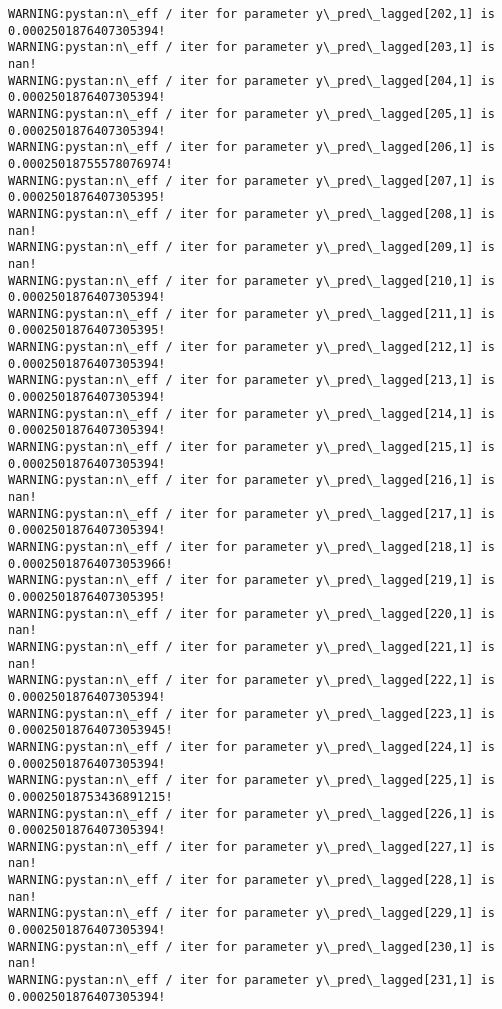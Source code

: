 \documentclass[11pt]{article}
\begin{document}
\begin{Verbatim}[commandchars=\\\{\}]
WARNING:pystan:n\_eff / iter for parameter y\_pred\_lagged[202,1] is 0.0002501876407305394!
WARNING:pystan:n\_eff / iter for parameter y\_pred\_lagged[203,1] is nan!
WARNING:pystan:n\_eff / iter for parameter y\_pred\_lagged[204,1] is 0.0002501876407305394!
WARNING:pystan:n\_eff / iter for parameter y\_pred\_lagged[205,1] is 0.0002501876407305394!
WARNING:pystan:n\_eff / iter for parameter y\_pred\_lagged[206,1] is 0.00025018755578076974!
WARNING:pystan:n\_eff / iter for parameter y\_pred\_lagged[207,1] is 0.0002501876407305395!
WARNING:pystan:n\_eff / iter for parameter y\_pred\_lagged[208,1] is nan!
WARNING:pystan:n\_eff / iter for parameter y\_pred\_lagged[209,1] is nan!
WARNING:pystan:n\_eff / iter for parameter y\_pred\_lagged[210,1] is 0.0002501876407305394!
WARNING:pystan:n\_eff / iter for parameter y\_pred\_lagged[211,1] is 0.0002501876407305395!
WARNING:pystan:n\_eff / iter for parameter y\_pred\_lagged[212,1] is 0.0002501876407305394!
WARNING:pystan:n\_eff / iter for parameter y\_pred\_lagged[213,1] is 0.0002501876407305394!
WARNING:pystan:n\_eff / iter for parameter y\_pred\_lagged[214,1] is 0.0002501876407305394!
WARNING:pystan:n\_eff / iter for parameter y\_pred\_lagged[215,1] is 0.0002501876407305394!
WARNING:pystan:n\_eff / iter for parameter y\_pred\_lagged[216,1] is nan!
WARNING:pystan:n\_eff / iter for parameter y\_pred\_lagged[217,1] is 0.0002501876407305394!
WARNING:pystan:n\_eff / iter for parameter y\_pred\_lagged[218,1] is 0.00025018764073053966!
WARNING:pystan:n\_eff / iter for parameter y\_pred\_lagged[219,1] is 0.0002501876407305395!
WARNING:pystan:n\_eff / iter for parameter y\_pred\_lagged[220,1] is nan!
WARNING:pystan:n\_eff / iter for parameter y\_pred\_lagged[221,1] is nan!
WARNING:pystan:n\_eff / iter for parameter y\_pred\_lagged[222,1] is 0.0002501876407305394!
WARNING:pystan:n\_eff / iter for parameter y\_pred\_lagged[223,1] is 0.00025018764073053945!
WARNING:pystan:n\_eff / iter for parameter y\_pred\_lagged[224,1] is 0.0002501876407305394!
WARNING:pystan:n\_eff / iter for parameter y\_pred\_lagged[225,1] is 0.00025018753436891215!
WARNING:pystan:n\_eff / iter for parameter y\_pred\_lagged[226,1] is 0.0002501876407305394!
WARNING:pystan:n\_eff / iter for parameter y\_pred\_lagged[227,1] is nan!
WARNING:pystan:n\_eff / iter for parameter y\_pred\_lagged[228,1] is nan!
WARNING:pystan:n\_eff / iter for parameter y\_pred\_lagged[229,1] is 0.0002501876407305394!
WARNING:pystan:n\_eff / iter for parameter y\_pred\_lagged[230,1] is nan!
WARNING:pystan:n\_eff / iter for parameter y\_pred\_lagged[231,1] is 0.0002501876407305394!

\end{Verbatim}
\end{document}
